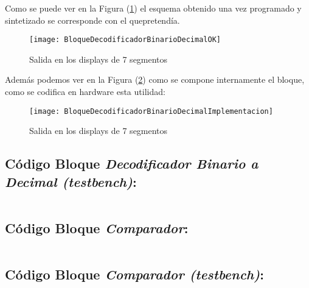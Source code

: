     Como se puede ver en la Figura (\ref{fig:BloqueDecodificadorBinarioDecimalOK}) el esquema obtenido una vez programado y sintetizado se corresponde con el quepretendía.
    \begin{figure}[H]
		    \centering
		    \texttt{[image: BloqueDecodificadorBinarioDecimalOK]}
		    \caption{Salida en los displays de 7 segmentos}
		    \label{fig:BloqueDecodificadorBinarioDecimalOK}
	\end{figure}
    Además podemos ver en la Figura (\ref{fig:BloqueDecodificadorBinarioDecimalImplementacion}) como se compone internamente el bloque, como se codifica en hardware esta utilidad:
    \begin{figure}[H]
		    \centering
		    \texttt{[image: BloqueDecodificadorBinarioDecimalImplementacion]}
		    \caption{Salida en los displays de 7 segmentos}
		    \label{fig:BloqueDecodificadorBinarioDecimalImplementacion}
	\end{figure}
    
\subsection{Código Bloque \textit{Decodificador Binario a Decimal (testbench)}:} \label{code:DecodificadorBinarioDecimal_tb}
    \inputminted[frame=lines,fontsize=\footnotesize,linenos]{vhdl}{CodeFiles/DecodificadorBinarioDecimal_tb.vhd}
    
\subsection{Código Bloque \textit{Comparador}:} \label{code:Comparador}
    \inputminted[frame=lines,fontsize=\footnotesize,linenos]{vhdl}{CodeFiles/Comparador.vhd}	

\subsection{Código Bloque \textit{Comparador (testbench)}:} \label{code:Comparador_tb}
